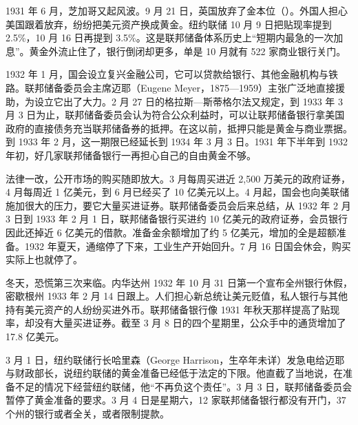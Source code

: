 1931 年 6 月，芝加哥又起风波\cite{frhpanic1}。9 月 21 日，英国放弃了金本位（）。外国人担心美国跟着放弃，纷纷把美元资产换成黄金\cite{frhpanic2}。纽约联储 10 月 9 日把贴现率提到 2.5\%，10 月 16 日再提到 3.5\%\cite{bernanke2002}。这是联邦储备体系历史上“短期内最急的一次加息”\cite{bernanke2002}。黄金外流止住了，银行倒闭却更多，单是 10 月就有 522 家商业银行关门\cite{bernanke2002,frb1937b}。

1932 年 1 月，国会设立复兴金融公司，它可以贷款给银行、其他金融机构与铁路\cite{frhpanic2}。联邦储备委员会主席迈耶（Eugene Meyer，1875—1959）主张广泛地直接援助，为设立它出了大力\cite{frhgd,loc28}。2 月 27 日的格拉斯—斯蒂格尔法又规定，到 1933 年 3 月 3 日为止，联邦储备委员会认为符合公众利益时，可以让联邦储备银行拿美国政府的直接债务充当联邦储备券的抵押\cite{stat1932}。在这以前，抵押只能是黄金与商业票据\cite{frhba32}。到 1933 年 2 月，这一期限已经延长到 1934 年 3 月 3 日\cite{frb1933}。1931 年下半年到 1932 年初，好几家联邦储备银行一再担心自己的自由黄金不够\cite{frhba32}。

法律一改，公开市场的购买随即放大。3 月每周买进近 2,500 万美元的政府证券，4 月每周近 1 亿美元，到 6 月已经买了 10 亿美元以上\cite{frhba32}。4 月起，国会也向美联储施加很大的压力，要它大量买进证券\cite{bernanke2002}。联邦储备委员会后来总结，从 1932 年 2 月 3 日到 1933 年 2 月 1 日，联邦储备银行买进约 10 亿美元的政府证券，会员银行因此还掉近 6 亿美元的借款。准备金余额增加了约 5 亿美元，增加的全是超额准备\cite{frb1933}。1932 年夏天，通缩停了下来，工业生产开始回升\cite{frhba32}。7 月 16 日国会休会，购买实际上也就停了\cite{bernanke2002}。

冬天，恐慌第三次来临。内华达州 1932 年 10 月 31 日第一个宣布全州银行休假，密歇根州 1933 年 2 月 14 日跟上\cite{frhpanic2}。人们担心新总统让美元贬值，私人银行与其他持有美元资产的人纷纷买进外币\cite{frhpanic2}。联邦储备银行像 1931 年秋天那样提高了贴现率，却没有大量买进证券\cite{frhpanic2}。截至 3 月 8 日的四个星期里，公众手中的通货增加了 17.8 亿美元\cite{frheba}。

3 月 1 日，纽约联储行长哈里森（George Harrison，生卒年未详）发急电给迈耶与财政部长，说纽约联储的黄金准备已经低于法定的下限\cite{frhholiday}。他直截了当地说，在准备不足的情况下经营纽约联储，他“不再负这个责任”\cite{frhholiday}。3 月 3 日，联邦储备委员会暂停了黄金准备的要求\cite{frhpanic2}。3 月 4 日是星期六，12 家联邦储备银行都没有开门，37 个州的银行或者全关，或者限制提款\cite{frhholiday}。

